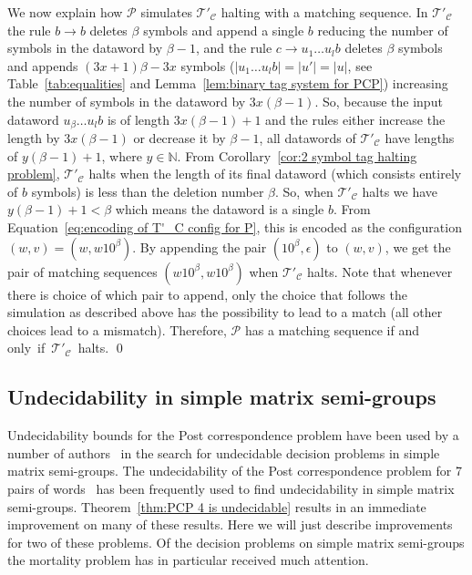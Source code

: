 \documentclass[11pt]{article} \usepackage{amsfonts,amsmath,amssymb,amsthm}
\renewenvironment{proof}{{\bfseries\noindent Proof.}}{\qed\vspace{3.5ex}}
\newcommand{\PCPfour}{\mathcal{P}}\newcommand{\CTS}{\mathcal{C}}\newcommand{\CTSp}{\mathcal{C'}}\newcommand{\TSTC}{\mathcal{T_{\CTS}}}\newcommand{\TSTCp}{\mathcal{T'_{\CTS}}}\def\Nset{\mathbb{N}}\def\Zset{\mathbb{Z}}\def\Qset{\mathbb{Q}}
\begin{document}
\begin{proof}
We now explain how $\PCPfour$ simulates $\TSTCp$ halting with a matching sequence. In $\TSTCp$ the rule $b\rightarrow b$ deletes $\beta$ symbols and append a single $b$ reducing the number of symbols in the dataword by $\beta-1$, and the rule $c\rightarrow u_1\ldots u_l b$ deletes $\beta$ symbols and appends $(3x+1)\beta-3x$ symbols ($|u_1\ldots u_l b|=|u'|=|u|$, see Table~\ref{tab:equalities} and Lemma~\ref{lem:binary tag system for PCP}) increasing the number of symbols in the dataword by $3x(\beta-1)$.
So, because the input dataword $u_{\beta}\dots u_lb$ is of length $3x(\beta-1)+1$ and the rules either increase the length by $3x(\beta-1)$ or decrease it by $\beta-1$, all datawords of $\TSTCp$ have lengths of $y(\beta-1)+1$, where $y\in\Nset$. 
From Corollary~\ref{cor:2 symbol tag halting problem}, $\TSTCp$ halts when the length of its final dataword (which consists entirely of $b$ symbols) is less than the deletion number $\beta$. 
So, when $\TSTCp$ halts we have $y(\beta-1)+1<\beta$ which means the dataword is a single $b$. 
From Equation~\eqref{eq:encoding of T'_C config for P}, this is encoded as the configuration $(w,v)=(w,w10^{\beta})$. 
By appending the pair $(10^{\beta},\epsilon)$ to $(w,v)$, we get the pair of matching sequences $(w10^{\beta},w10^{\beta})$ when $\TSTCp$ halts. 
Note that whenever there is choice of which pair to append, only the choice that follows the simulation as described above has the possibility to lead to a match (all other choices lead to a mismatch). 
Therefore, $\PCPfour$ has a matching sequence if and \mbox{only if $\TSTCp$ halts.}
\end{proof}

\subsection{Undecidability in simple matrix semi-groups}
Undecidability bounds for the Post correspondence problem have been used by a number of authors~\cite{Bell2008,Blondel1997,Bournez2002,Cassaigne1998,Halava2001,Halava2007,Halava2007A,Paterson1970} in the search for undecidable decision problems in simple matrix semi-groups. The undecidability of the Post correspondence problem for 7 pairs of words~\cite{Matiyasevich2005}
has been frequently used to find undecidability in simple matrix semi-groups. Theorem~\ref{thm:PCP 4 is undecidable} results in an immediate improvement on many of these results. Here we will just describe improvements for two of these problems. Of the decision problems on simple matrix semi-groups the mortality problem has in particular received much attention. 
\end{document}
